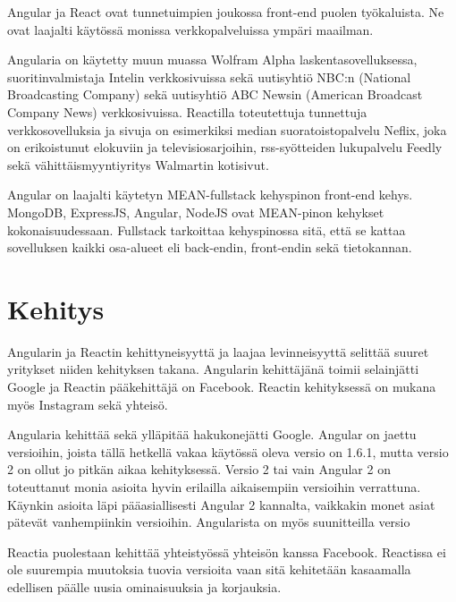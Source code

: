 \documentclass[a4paper,12pt,twoside]{article} %
\begin{document}
\vspace{4mm}\noindent Angular ja React ovat tunnetuimpien joukossa front-end puolen työkaluista. Ne ovat laajalti käytössä monissa verkkopalveluissa ympäri maailman.

\vspace{4mm}\noindent Angularia on käytetty muun muassa Wolfram Alpha laskentasovelluksessa\cite{angularlist}, suoritinvalmistaja Intelin verkkosivuissa sekä uutisyhtiö NBC:n (National Broadcasting Company) sekä uutisyhtiö ABC Newsin (American Broadcast Company News) verkkosivuissa.\cite{angularwikipedia} Reactilla toteutettuja tunnettuja verkkosovelluksia ja sivuja on esimerkiksi median suoratoistopalvelu Neflix, joka on erikoistunut elokuviin ja televisiosarjoihin, rss-syötteiden lukupalvelu Feedly sekä vähittäismyyntiyritys Walmartin kotisivut. \cite{reactlist}

\vspace{4mm}\noindent Angular on laajalti käytetyn MEAN-fullstack kehyspinon front-end kehys. MongoDB, ExpressJS, Angular, NodeJS ovat MEAN-pinon kehykset kokonaisuudessaan. Fullstack tarkoittaa kehyspinossa sitä, että se kattaa sovelluksen kaikki osa-alueet eli back-endin, front-endin sekä tietokannan.

\newpage


\section{Kehitys}

Angularin ja Reactin kehittyneisyyttä ja laajaa levinneisyyttä selittää suuret yritykset niiden kehityksen takana. Angularin kehittäjänä toimii selainjätti Google ja Reactin pääkehittäjä on Facebook. Reactin kehityksessä on mukana myös Instagram sekä yhteisö.

\vspace{4mm}\noindent Angularia kehittää sekä ylläpitää hakukonejätti Google. Angular on jaettu versioihin, joista tällä hetkellä vakaa käytössä oleva versio on 1.6.1, mutta versio 2 on ollut jo pitkän aikaa kehityksessä. Versio 2 tai vain Angular 2 on toteuttanut monia asioita hyvin erilailla aikaisempiin versioihin verrattuna. Käynkin asioita läpi pääasiallisesti Angular 2 kannalta, vaikkakin monet asiat pätevät vanhempiinkin versioihin. Angularista on myös suunitteilla versio

\vspace{4mm}\noindent
Reactia puolestaan kehittää yhteistyössä yhteisön kanssa Facebook. Reactissa ei ole suurempia muutoksia tuovia versioita vaan sitä kehitetään kasaamalla edellisen päälle uusia ominaisuuksia ja korjauksia.
\end{document}
